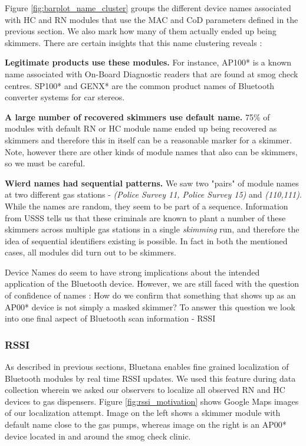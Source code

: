 Figure \ref{fig:barplot_name_cluster} groups the different device names associated with HC and RN modules that use the MAC and CoD parameters defined in the previous section. We also mark how many of them actually ended up being skimmers. There are certain insights that this name clustering reveals :

\begin{prettylist}
	\item \textbf{Legitimate products use these modules.} For instance, AP100* is a known name associated with On-Board Diagnostic readers that are found at smog check centres. SP100* and GENX* are the common product names of Bluetooth converter systems for car stereos. 
	\item \textbf{A large number of recovered skimmers use default name.} 75\% of modules with default RN or HC module name ended up being recovered as skimmers and therefore this in itself can be a reasonable marker for a skimmer. Note, however there are other kinds of module names that also can be skimmers, so we must be careful.
	\item \textbf{Wierd names had sequential patterns.} We saw two "pairs" of module names at two different gas stations - \textit{(Police Survey 11, Police Survey 15)} and \textit{(110,111)}. While the names are random, they seem to be part of a sequence. Information from USSS tells us that these criminals are known to plant a number of these skimmers across multiple gas stations in a single \textit{skimming} run, and therefore the idea of sequential identifiers existing is possible. In fact in both the mentioned cases, all modules did turn out to be skimmers.
\end{prettylist}

Device Names do seem to have strong implications about the intended application of the Bluetooth device. However, we are still faced with the question of confidence of names : How do we confirm that something that shows up as an AP00* device is not simply a masked skimmer? To answer this question we look into one final aspect of Bluetooth scan information - RSSI

\subsubsection{RSSI}
As described in previous sections, Bluetana enables fine grained localization of Bluetooth modules by real time RSSI updates. We used this feature during data collection wherein we asked our observers to localize all observed RN and HC devices to gas dispensers. Figure \ref{fig:rssi_motivation} shows Google Maps images of our localization attempt. Image on the left shows a skimmer module with default name close to the gas pumps, whereas image on the right is an AP00* device located in and around the smog check clinic.

